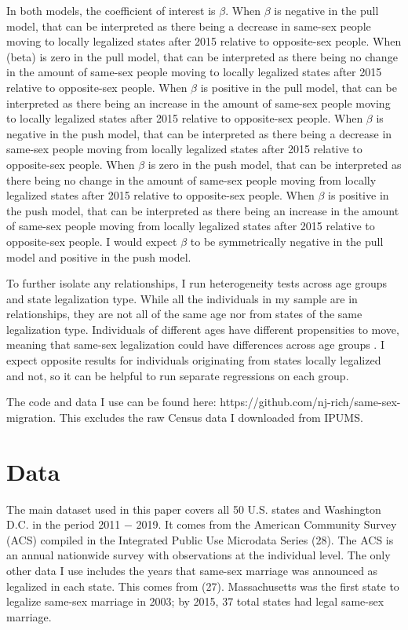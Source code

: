 \documentclass[12pt,letterpaper]{article}
\begin{document}
In both models, the coefficient of interest is $\beta$. When $\beta$ is negative in the pull model, that can be interpreted as there being a decrease in same-sex people moving to locally legalized states after 2015 relative to opposite-sex people. When (beta) is zero in the pull model, that can be interpreted as there being no change in the amount of same-sex people moving to locally legalized states after 2015 relative to opposite-sex people. When $\beta$ is positive in the pull model, that can be interpreted as there being an increase in the amount of same-sex people moving to locally legalized states after 2015 relative to opposite-sex people. When $\beta$ is negative in the push model, that can be interpreted as there being a decrease in same-sex people moving from locally legalized states after 2015 relative to opposite-sex people. When $\beta$ is zero in the push model, that can be interpreted as there being no change in the amount of same-sex people moving from locally legalized states after 2015 relative to opposite-sex people. When $\beta$ is positive in the push model, that can be interpreted as there being an increase in the amount of same-sex people moving from locally legalized states after 2015 relative to opposite-sex people. I would expect $\beta$ to be symmetrically negative in the pull model and positive in the push model.

To further isolate any relationships, I run heterogeneity tests across age groups and state legalization type. While all the individuals in my sample are in relationships, they are not all of the same age nor from states of the same legalization type. Individuals of different ages have different propensities to move, meaning that same-sex legalization could have differences across age groups \citep{1, 17}.  I expect opposite results for individuals originating from states locally legalized and not, so it can be helpful to run separate regressions on each group.

The code and data I use can be found here: https://github.com/nj-rich/same-sex-migration. This excludes the raw Census data I downloaded from IPUMS.

\section{Data}

The main dataset used in this paper covers all 50 U.S. states and Washington D.C. in the period 2011 − 2019. It comes from the American Community Survey (ACS) compiled in the Integrated Public Use Microdata Series (28). The ACS is an annual nationwide survey with observations at the individual level. The only other data I use includes the years that same-sex marriage was announced as legalized in each state. This comes from (27). Massachusetts was the first state to legalize same-sex marriage in 2003; by 2015, 37 total states had legal same-sex marriage.
\end{document}
